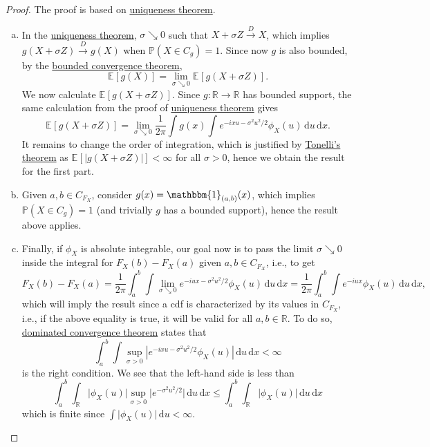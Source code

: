 \begin{proof}
	The proof is based on \hyperref[thm:characteristic-function-uniqueness]{uniqueness theorem}.
	\begin{enumerate}[(a)]
		\item In the \hyperref[thm:characteristic-function-uniqueness]{uniqueness theorem}, \(\sigma \searrow 0\) such that \(X+ \sigma Z \overset{D}{\to } X\), which implies \(g(X + \sigma Z) \overset{D}{\to } g(X)\) when \(\mathbb{P} (X \in C_g) = 1\). Since now \(g\) is also bounded, by the \href{https://en.wikipedia.org/wiki/Dominated_convergence_theorem}{bounded convergence theorem},
		      \[
			      \mathbb{E}_{}[g(X)] = \lim_{\sigma \searrow 0} \mathbb{E}_{}[g(X + \sigma Z)].
		      \]
		      We now calculate \(\mathbb{E}_{}[g(X + \sigma Z)] \). Since \(g\colon \mathbb{R} \to \mathbb{R} \) has bounded support, the same calculation from the proof of \hyperref[thm:characteristic-function-uniqueness]{uniqueness theorem} gives
		      \[
			      \mathbb{E}_{}[g(X + \sigma Z)]
			      = \lim_{\sigma \searrow 0} \frac{1}{2\pi } \int g(x) \int e^{-i x u - \sigma ^2 u^2 / 2} \phi _X(u) \,\mathrm{d} u \,\mathrm{d} x .
		      \]
		      It remains to change the order of integration, which is justified by \href{https://en.wikipedia.org/wiki/Fubini%27s_theorem#Fubini%E2%80%93Tonelli_theorem}{Tonelli's theorem} as \(\mathbb{E}_{}[\vert g(X + \sigma Z) \vert ] < \infty \) for all \(\sigma > 0\), hence we obtain the result for the first part.
		\item Given \(a, b\in C_{F_X}\), consider \(g(x) = \mathbbm{1}_{(a, b)} (x) \), which implies \(\mathbb{P} (X \in C_g) = 1\) (and trivially \(g\) has a bounded support), hence the result above applies.
		\item Finally, if \(\phi _X\) is absolute integrable, our goal now is to pass the limit \(\sigma \searrow 0\) inside the integral for \(F_X(b) - F_X(a)\) given \(a, b \in C_{F_X}\), i.e., to get
		      \[
			      F_X(b) - F_X(a)
			      = \frac{1}{2\pi } \int_{a}^{b} \int \lim_{\sigma \searrow 0} e^{-iux - \sigma ^2 u^2 / 2} \phi _X(u) \,\mathrm{d}u \,\mathrm{d} x
			      = \frac{1}{2\pi } \int_{a}^{b} \int e^{-iux} \phi _X(u) \,\mathrm{d}u \,\mathrm{d} x ,
		      \]
		      which will imply the result since a cdf is characterized by its values in \(C_{F_X}\), i.e., if  the above equality is true, it will be valid for all \(a, b \in \mathbb{R} \). To do so, \href{https://en.wikipedia.org/wiki/Dominated_convergence_theorem}{dominated convergence theorem} states that
		      \[
			      \int_{a}^{b} \int \sup _{\sigma > 0} \left\vert e^{-i x u - \sigma ^2 u^2 / 2} \phi _X (u) \right\vert \,\mathrm{d} u \,\mathrm{d} x < \infty
		      \]
		      is the right condition. We see that the left-hand side is less than
		      \[
			      \int_{a}^{b} \int _\mathbb{R} \vert \phi _X(u) \vert \sup _{\sigma > 0} \vert e^{- \sigma ^2 u^2 / 2} \vert \,\mathrm{d} u \,\mathrm{d} x
			      \leq \int_{a}^{b} \int _\mathbb{R} \vert \phi _X(u) \vert \,\mathrm{d} u \,\mathrm{d} x
		      \]
		      which is finite since \(\int \vert \phi _X(u) \vert \,\mathrm{d} u < \infty \).
	\end{enumerate}
\end{proof}

